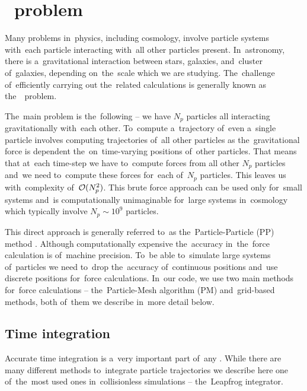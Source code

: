 \section{\nbody\ problem}
Many problems in~physics, including cosmology, involve particle systems with~each particle interacting with~all other particles present. In~astronomy, there is a~gravitational interaction between stars, galaxies, and~cluster of~galaxies, depending on~the~scale which we are studying. The~challenge of~efficiently carrying out the~related calculations is generally known as the~\nbody\ problem.

The~main problem is the~following -- we have $N_p$ particles all interacting gravitationally with~each other. To~compute a~trajectory of~even a~single particle involves computing trajectories of~all other particles as the~gravitational force is dependent the~on~time-varying positions of~other particles. That means that at~each time-step we have to~compute forces from all other $N_p$ particles and~we need to~compute these forces for~each of~$N_p$ particles. This leaves us with~complexity of~\(\mathcal{O}(N_p^2)\). This brute force approach can be used only for~small systems and~is computationally unimaginable for~large systems in~cosmology which typically involve \(N_p\sim10^{9}\) particles.

This direct approach is generally referred to~as the~Particle-Particle (PP) method \parencite{Hockney:1988:CSU:62815}. Although computationally expensive the~accuracy in~the~force calculation is of~machine precision. To~be able to~simulate large systems of~particles we need to~drop the~accuracy of~continuous positions and~use discrete positions for~force calculations. In~our code, we use two main methods for~force calculations -- the~Particle-Mesh algorithm (PM) and~grid-based methods, both of~them we describe in~more detail below.
\subsection{Time integration}
Accurate time integration is a~very important part of~any \nbodysim. While there are many different methods to~integrate particle trajectories \parencite[see e.g.][]{Hockney:1988:CSU:62815} we describe here one of~the~most used ones in~collisionless simulations -- the~Leapfrog integrator.


